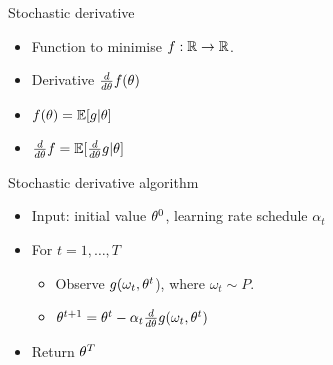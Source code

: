 \documentclass[smaller]{beamer}
\begin{document}
\begin{frame}[label={sec:orge45363a}]{Stochastic derivative}
\begin{itemize}
\item Function to minimise \(f : \mathbb{R} \to \mathbb{R}\).
\item Derivative \(\frac{d}{d \theta} f(\theta)\)
\item \(f(\theta) = \mathop{\mbox{\ensuremath{\mathbb{E}}}}\nolimits[g | \theta]\)
\item \(\frac{d}{d \theta} f = \mathop{\mbox{\ensuremath{\mathbb{E}}}}\nolimits[ \frac{d}{d \theta} g | \theta]\)
\end{itemize}
\pause
\begin{block}{Stochastic derivative algorithm}
\begin{itemize}
\item Input: initial value \(\theta^0\), \alert{learning rate} schedule \(\alpha_t\)
\item For \(t=1, \ldots, T\)
\begin{itemize}
\item Observe \(g(\omega_t, \theta^t\)), where \(\omega_t \sim P\).
\item \(\theta^{t+1} = \theta^t - \alpha_t \frac{d}{d \theta} g(\omega_t, \theta^t)\)
\end{itemize}
\item Return \(\theta^T\)
\end{itemize}
\end{block}
\end{frame}
\end{document}
